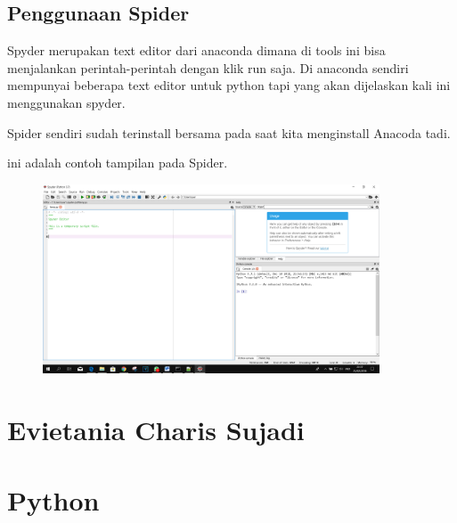 \subsection{Penggunaan Spider}
Spyder merupakan text editor dari anaconda dimana di tools ini bisa menjalankan perintah-perintah dengan klik run saja. 
Di anaconda sendiri mempunyai beberapa text editor untuk python tapi yang akan dijelaskan kali ini menggunakan spyder.

Spider sendiri sudah terinstall bersama pada saat kita menginstall Anacoda tadi.

ini adalah contoh tampilan pada Spider.
\begin{figure}[H]
		\includegraphics[width=10cm]{figures/fahmi/3.png}
		\centering
	\end{figure}
\section{Evietania Charis Sujadi}

\section{Python}
